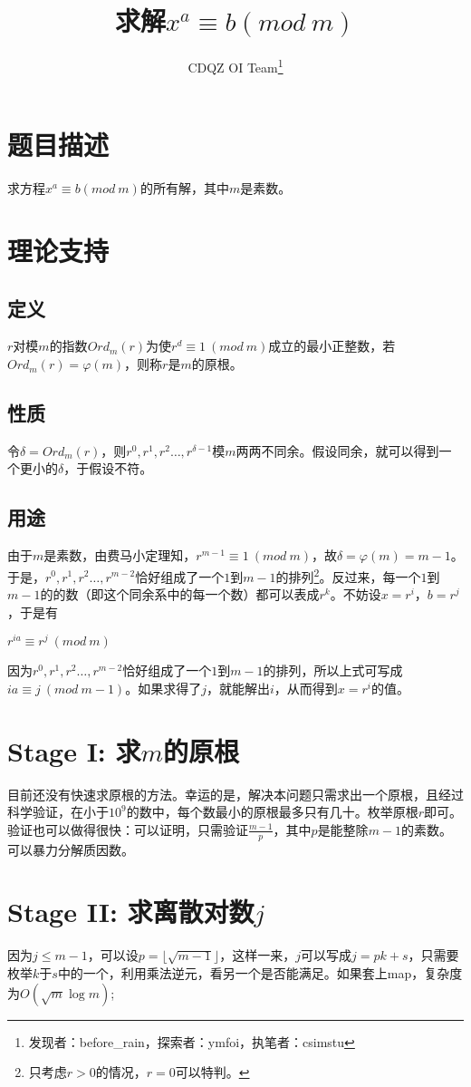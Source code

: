 \documentclass{article}
\title{求解$x^a \equiv b(mod\ m)$}
\author{CDQZ OI Team\footnote{发现者：before\_rain，探索者：ymfoi，执笔者：csimstu}}
\begin{document}
\maketitle
\tableofcontents

\section{题目描述}
求方程$x^a \equiv b(mod\ m)$的所有解，其中$m$是素数。
\section{理论支持}
\subsection{定义} $r$对模$m$的指数$Ord_m(r)$为使$r^d \equiv 1\ (mod\ m)$成立的最小正整数，若$Ord_m(r) = \varphi(m)$，则称$r$是$m$的原根。
\subsection{性质} 令$\delta = Ord_m(r)$，则$r^0,r^1,r^2 \ldots ,r^{\delta-1}$模$m$两两不同余。假设同余，就可以得到一个更小的$\delta$，于假设不符。
\subsection{用途} 由于$m$是素数，由费马小定理知，$r^{m-1} \equiv 1 \ (mod\ m)$，故$\delta = \varphi(m) = m - 1$。于是，$r^0,r^1,r^2 \ldots ,r^{m-2}$恰好组成了一个$1$到$m-1$的排列\footnote{只考虑$r > 0$的情况，$r = 0$可以特判。}。反过来，每一个$1$到$m-1$的的数（即这个同余系中的每一个数）都可以表成$r^k$。不妨设$x = r^i$，$b = r^j$，于是有
\begin{center}
$r^{ia} \equiv r^j\ (mod\ m)$
\end{center}
因为$r^0,r^1,r^2 \ldots ,r^{m-2}$恰好组成了一个$1$到$m-1$的排列，所以上式可写成$ia \equiv j\ (mod\ m - 1)$。如果求得了$j$，就能解出$i$，从而得到$x=r^i$的值。
\section{Stage I: 求$m$的原根}
目前还没有快速求原根的方法。幸运的是，解决本问题只需求出一个原根，且经过科学验证，在小于$10^9$的数中，每个数最小的原根最多只有几十。枚举原根$r$即可。验证也可以做得很快：可以证明，只需验证$\frac{m-1}{p}$，其中$p$是能整除$m-1$的素数。可以暴力分解质因数。
\section{Stage II: 求离散对数$j$}
因为$j \leq m-1$，可以设$p = \lfloor \sqrt{m-1} \rfloor$，这样一来，$j$可以写成$j = pk + s$，只需要枚举$k$于$s$中的一个，利用乘法逆元，看另一个是否能满足。如果套上map，复杂度为$O(\sqrt{m} \log m)$;
\end{document}
